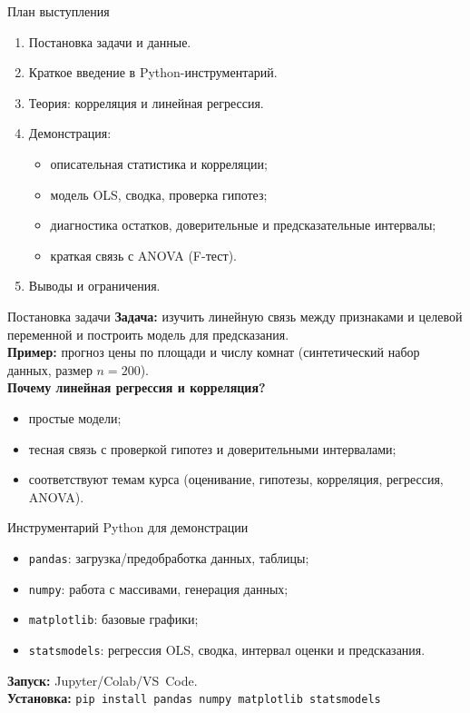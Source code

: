 \documentclass{beamer}
\begin{document}
\begin{frame}{План выступления}
\begin{enumerate}
  \item Постановка задачи и данные.
  \item Краткое введение в Python-инструментарий.
  \item Теория: корреляция и линейная регрессия.
  \item Демонстрация:
  \begin{itemize}
    \item описательная статистика и корреляции;
    \item модель OLS, сводка, проверка гипотез;
    \item диагностика остатков, доверительные и предсказательные интервалы;
    \item краткая связь с ANOVA (F-тест).
  \end{itemize}
  \item Выводы и ограничения.
\end{enumerate}
\end{frame}


\begin{frame}{Постановка задачи}
\textbf{Задача:} изучить линейную связь между признаками и целевой переменной и построить модель для предсказания.\\[6pt]
\textbf{Пример:} прогноз цены по площади и числу комнат (синтетический набор данных, размер $n=200$).\\[6pt]
\textbf{Почему линейная регрессия и корреляция?}
\begin{itemize}
  \item простые модели;
  \item тесная связь с проверкой гипотез и доверительными интервалами;
  \item соответствуют темам курса (оценивание, гипотезы, корреляция, регрессия, ANOVA).
\end{itemize}
\end{frame}

\begin{frame}{Инструментарий Python для демонстрации}
\begin{itemize}
  \item \texttt{pandas}: загрузка/предобработка данных, таблицы;
  \item \texttt{numpy}: работа с массивами, генерация данных;
  \item \texttt{matplotlib}: базовые графики;
  \item \texttt{statsmodels}: регрессия OLS, сводка, интервал оценки и предсказания.
\end{itemize}
\textbf{Запуск:} Jupyter/Colab/VS~Code.\\
\textbf{Установка:} \texttt{pip install pandas numpy matplotlib statsmodels}
\end{frame}
\end{document}
